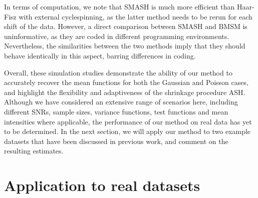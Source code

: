 \documentclass[12pt]{article}
\begin{document}
In terms of computation, we note that SMASH is much more efficient than Haar-Fisz with external cyclespinning, as the latter method needs to be rerun for each shift of the data. However, a direct comparison between SMASH and BMSM is uninformative, as they are coded in different programming environments. Nevertheless, the similarities between the two methods imply that they should behave identically in this aspect, barring differences in coding.

Overall, these simulation studies demonstrate the ability of our method to accurately recover the mean functions for both the Gaussian and Poisson cases, and highlight the flexibility and adaptiveness of the shrinkage procedure ASH. Although we have considered an extensive range of scenarios here, including different SNRs, sample sizes, variance functions, test functions and mean intensities where applicable, the performance of our method on real data has yet to be determined. In the next section, we will apply our method to two example datasets that have been discussed in previous work, and comment on the resulting estimates.



\section{Application to real datasets}
\end{document}
